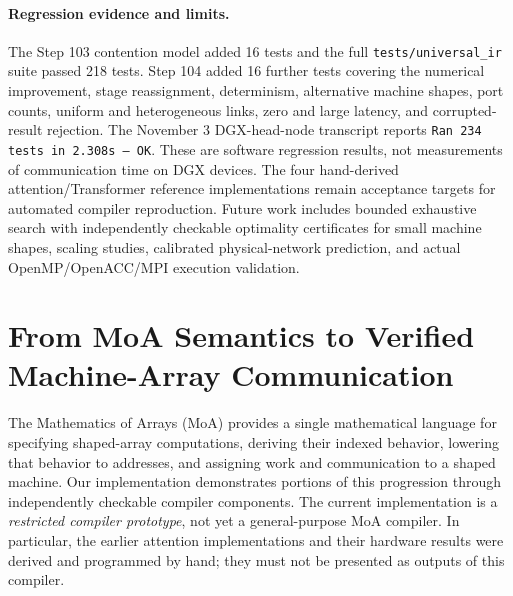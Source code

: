 \documentclass[11pt]{article}
\begin{document}
\paragraph{Regression evidence and limits.}
The Step 103 contention model added 16 tests and the full
\texttt{tests/universal\_ir} suite passed 218 tests. Step 104 added
16 further tests covering the numerical improvement, stage reassignment,
determinism, alternative machine shapes, port counts, uniform and
heterogeneous links, zero and large latency, and corrupted-result
rejection. The November 3 DGX-head-node transcript reports
\texttt{Ran 234 tests in 2.308s --- OK}. These are software regression
results, not measurements of communication time on DGX devices.
The four hand-derived attention/Transformer reference implementations
remain acceptance targets for automated compiler reproduction. Future
work includes bounded exhaustive search with independently checkable
optimality certificates for small machine shapes, scaling studies,
calibrated physical-network prediction, and actual OpenMP/OpenACC/MPI
execution validation.

\clearpage

\section{From MoA Semantics to Verified Machine-Array Communication}
\label{step108:sec:moa-compiler-architecture}

The Mathematics of Arrays (MoA) provides a single mathematical language for
specifying shaped-array computations, deriving their indexed behavior, lowering
that behavior to addresses, and assigning work and communication to a shaped
machine.  Our implementation demonstrates portions of this progression through
independently checkable compiler components.  The current implementation is a
\emph{restricted compiler prototype}, not yet a general-purpose MoA compiler.
In particular, the earlier attention implementations and their hardware results
were derived and programmed by hand; they must not be presented as outputs of
this compiler.
\end{document}
